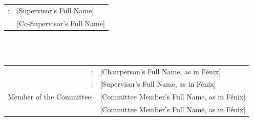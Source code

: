 \begin{center}
\vspace{1.0cm}
{\FontSn %
\begin{tabular}{ll}
	\coverSupervisors: & [Supervisor's Full Name] \\
	                   & [Co-Supervisor's Full Name]
\end{tabular} } \\

\vspace{1.0cm}
{\FontMb \coverExaminationCommittee} \\
\vspace{0.3cm}
{\FontSn %
\begin{tabular}{rl}
	  \coverChairperson:    & [Chairperson's Full Name, as in Fénix]  \\
	  \coverSupervisor:     & [Supervisor's Full Name, as in Fénix]   \\
	Member of the Committee:	& [Committee Member's Full Name, as in Fénix] \\
								& [Committee Member's Full Name, as in Fénix]
\end{tabular} } \\

\vspace{1.5cm}
{} \\ 


\end{center}